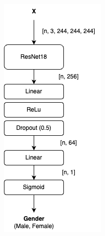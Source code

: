 \begin{figure}[htbp]
\begin{subfigure}{0.2\linewidth}
    \end{subfigure}
    \begin{subfigure}{0.2\linewidth}
        \centering
        \includegraphics[width=\linewidth]{images/GenderModel.png}

\end{subfigure}
\end{figure}
